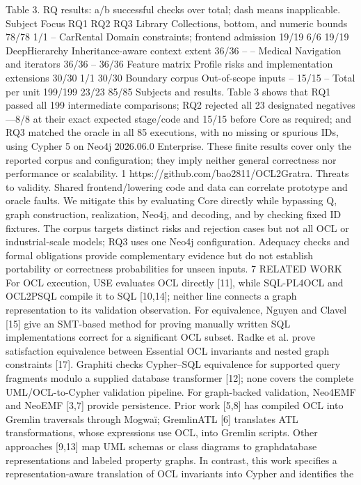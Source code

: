 Table 3. RQ results: a/b successful checks over total; dash means inapplicable.
Subject Focus RQ1 RQ2 RQ3
Library Collections, bottom, and numeric bounds 78/78 1/1 –
CarRental Domain constraints; frontend admission 19/19 6/6 19/19
DeepHierarchy Inheritance-aware context extent 36/36 – –
Medical Navigation and iterators 36/36 – 36/36
Feature matrix Profile risks and implementation extensions 30/30 1/1 30/30
Boundary corpus Out-of-scope inputs – 15/15 –
Total per unit 199/199 23/23 85/85
Subjects and results. Table 3 shows that RQ1 passed all 199 intermediate comparisons;
RQ2 rejected all 23 designated negatives—8/8 at their exact expected stage/code and
15/15 before Core as required; and RQ3 matched the oracle in all 85 executions, with
no missing or spurious IDs, using Cypher 5 on Neo4j 2026.06.0 Enterprise. These finite
results cover only the reported corpus and configuration; they imply neither general
correctness nor performance or scalability.
1
https://github.com/bao2811/OCL2Gratra.
Threats to validity. Shared frontend/lowering code and data can correlate prototype and
oracle faults. We mitigate this by evaluating Core directly while bypassing Q, graph construction, realization, Neo4j, and decoding, and by checking fixed ID fixtures. The corpus targets distinct risks and rejection cases but not all OCL or industrial-scale models;
RQ3 uses one Neo4j configuration. Adequacy checks and formal obligations provide
complementary evidence but do not establish portability or correctness probabilities for
unseen inputs.
7 RELATED WORK
For OCL execution, USE evaluates OCL directly [11], while SQL-PL4OCL and
OCL2PSQL compile it to SQL [10,14]; neither line connects a graph representation to
its validation observation. For equivalence, Nguyen and Clavel [15] give an SMT-based
method for proving manually written SQL implementations correct for a significant
OCL subset. Radke et al. prove satisfaction equivalence between Essential OCL invariants and nested graph constraints [17]. Graphiti checks Cypher–SQL equivalence for
supported query fragments modulo a supplied database transformer [12]; none covers
the complete UML/OCL-to-Cypher validation pipeline.
For graph-backed validation, Neo4EMF and NeoEMF [3,7] provide persistence.
Prior work [5,8] has compiled OCL into Gremlin traversals through Mogwaï; GremlinATL [6] translates ATL transformations, whose expressions use OCL, into Gremlin
scripts. Other approaches [9,13] map UML schemas or class diagrams to graphdatabase representations and labeled property graphs. In contrast, this work specifies
a representation-aware translation of OCL invariants into Cypher and identifies the
